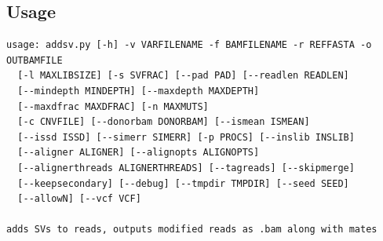 \documentclass[letterpaper,11pt]{article}
\begin{document}
\subsection{Usage}
\begin{verbatim}
usage: addsv.py [-h] -v VARFILENAME -f BAMFILENAME -r REFFASTA -o OUTBAMFILE
  [-l MAXLIBSIZE] [-s SVFRAC] [--pad PAD] [--readlen READLEN]
  [--mindepth MINDEPTH] [--maxdepth MAXDEPTH]
  [--maxdfrac MAXDFRAC] [-n MAXMUTS]
  [-c CNVFILE] [--donorbam DONORBAM] [--ismean ISMEAN]
  [--issd ISSD] [--simerr SIMERR] [-p PROCS] [--inslib INSLIB]
  [--aligner ALIGNER] [--alignopts ALIGNOPTS]
  [--alignerthreads ALIGNERTHREADS] [--tagreads] [--skipmerge]
  [--keepsecondary] [--debug] [--tmpdir TMPDIR] [--seed SEED]
  [--allowN] [--vcf VCF]

adds SVs to reads, outputs modified reads as .bam along with mates


\end{verbatim}
\end{document}
